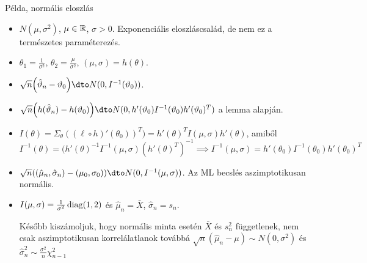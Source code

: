 \documentclass[aspectratio=169,notheorems,9pt,\option]{beamer}
\begin{document}
\begin{frame}{Példa, normális eloszlás}
  \begin{itemize}
    \item $N(\mu,\sigma^2)$, $\mu\in\mathbb{R}$, $\sigma>0$. 
    Exponenciális eloszláscsalád, de nem ez a természetes paraméterezés.
    \item $\theta_1=\frac1{\sigma^2}$, $\theta_2=\frac\mu{\sigma^2}$, $(\mu,\sigma)= h(\theta)$.
    \item $\sqrt{n}\zjel*{\hat\theta_n-\theta_0}\dto N(0, I^{-1}(\theta_0))$.
    \item $\sqrt{n}\zjel*{h(\hat\theta_n)-h(\theta_0)}\dto N(0,h'(\theta_0)I^{-1}(\theta_0)h'(\theta_0)^T)$ a lemma alapján.
    \item $I(\theta) =\Sigma_{\theta} ((\ell\circ h)'(\theta_0))^T)=h'(\theta)^T I(\mu,\sigma)h'(\theta)$, 
    amiből 
    \begin{displaymath}
      I^{-1}(\theta) =(h'(\theta)^{-1} I^{-1}(\mu,\sigma) (h'(\theta)^T)^{-1}
      \implies
      I^{-1}(\mu,\sigma) = h'(\theta_0)I^{-1}(\theta_0)h'(\theta_0)^T
    \end{displaymath}
    \item $\sqrt{n} \zjel*{(\hat\mu_n,\hat\sigma_n)-(\mu_0,\sigma_0)}\dto N(0,I^{-1}(\mu,\sigma))$. 
    Az ML becslés aszimptotikusan normális.
    \item $I(\mu,\sigma)=\frac1{\sigma^2}\operatorname{diag}(1,2)$ és $\hat\mu_n=\bar{X}$, $\hat\sigma_n=s_n$.
    
    Később kiszámoljuk, hogy normális minta esetén $\bar{X}$ és $s_n^2$ függetlenek, 
    nem csak aszimptotikusan korrelálatlanok továbbá
    $\sqrt{n}(\hat\mu_n-\mu)\sim N(0,\sigma^2)$ és $\hat\sigma^2_n \sim \frac{\sigma^2}{n}\chi_{n-1}^2$
  \end{itemize}
\end{frame}
\end{document}
